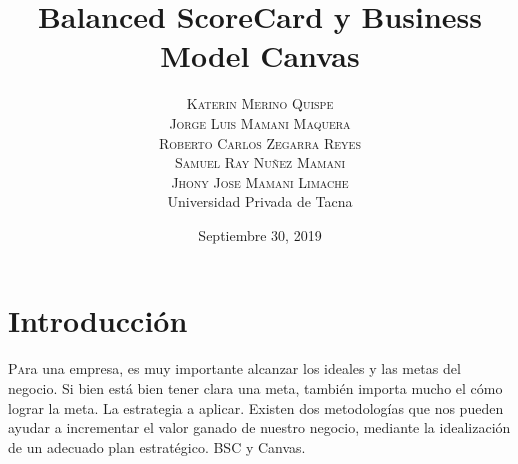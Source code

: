 \documentclass[twoside,twocolumn]{article}
\title{Balanced ScoreCard y Business Model Canvas} %
\author{%
\textsc{Katerin Merino Quispe} \\[1ex] %
\textsc{Jorge Luis Mamani Maquera} \\[1.01ex] %
\textsc{Roberto Carlos Zegarra Reyes} \\[1.02ex] %
\textsc{Samuel Ray Nuñez Mamani} \\[1.03ex] %
\textsc{Jhony Jose Mamani Limache} \\[1.04ex] %
\normalsize Universidad Privada de Tacna \\  %
\normalsize {} %
}
\date{Septiembre 30, 2019} %
\begin{document}
\maketitle


\section{Introducción}

\lettrine[nindent=0em,lines=2]{P}ara una empresa, es muy importante alcanzar los ideales y las metas del negocio. Si bien está bien tener clara una meta, también importa mucho el cómo lograr la meta. La estrategia a aplicar. Existen dos metodologías que nos pueden ayudar a incrementar el valor ganado de nuestro negocio, mediante la idealización de un adecuado plan estratégico. BSC y Canvas.
\end{document}
